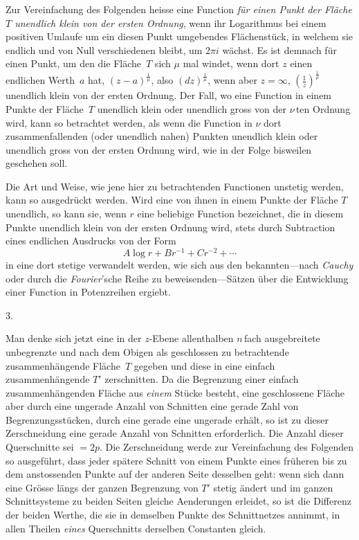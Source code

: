 \documentclass[a4paper,12pt,leqno]{article}
\begin{document}
Zur Vereinfachung des Folgenden heisse eine Function
\emph{f\"{u}r einen Punkt der Fl\"{a}che $T$ unendlich klein von
der ersten Ordnung}, wenn ihr Logarithmus bei einem positiven
Umlaufe um ein diesen Punkt umgebendes Fl\"{a}chenst\"{u}ck, in
welchem sie endlich und von Null verschiedenen bleibt, um
$2\pi i$ w\"{a}chst.  Es ist demnach f\"{u}r einen Punkt, um den
die Fl\"{a}che~$T$ sich $\mu$ mal windet, wenn dort $z$ einen
endlichen Werth~$a$ hat,
$\displaystyle (z - a)^{\frac{1}{\mu}}$,
also
$\displaystyle (dz)^{\frac{1}{\mu}}$,
wenn aber $z = \infty$,
$\displaystyle \left( \frac{1}{z} \right)^{\frac{1}{\mu}}$
unendlich klein von der ersten Ordnung.  Der Fall, wo eine
Function in einem Punkte der Fl\"{a}che~$T$ unendlich klein oder
unendlich gross von der $\nu \,$\-ten Ordnung wird, kann so
betrachtet werden, als wenn die Function in $\nu$ dort
zusammenfallenden (oder unendlich nahen) Punkten unendlich klein
oder unendlich gross von der ersten Ordnung wird, wie in der
Folge bisweilen geschehen soll.

Die Art und Weise, wie jene hier zu betrachtenden Functionen
unstetig werden, kann so ausgedr\"{u}ckt werden.  Wird eine von
ihnen in einem Punkte der Fl\"{a}che $T$ unendlich, so kann sie,
wenn $r$ eine beliebige Function bezeichnet, die in diesem Punkte
unendlich klein von der ersten Ordnung wird, stets durch
Subtraction eines endlichen Ausdrucks von der Form
\[ A \log r + B r^{-1} + C r^{-2} + \cdots \]
in eine dort stetige verwandelt werden, wie sich aus den
bekannten---nach \emph{Cauchy} oder durch die
\emph{Fourier}'sche Reihe zu beweisenden---S\"{a}tzen \"{u}ber
die Entwicklung einer Function in Potenzreihen ergiebt.

\medbreak

\centerline{3.}

\nobreak\medskip

Man denke sich jetzt eine in der $z$-Ebene allenthalben $n \,$\-fach
ausgebreitete unbegrenzte und nach dem Obigen als geschlossen zu
betrachtende zusammenh\"{a}ngende Fl\"{a}che~$T$ gegeben und
diese in eine einfach zusammenh\"{a}ngende $T'$ zerschnitten.  Da
die Begrenzung einer einfach zusammenh\"{a}ngenden Fl\"{a}che aus
\emph{einem} St\"{u}cke besteht, eine geschlossene Fl\"{a}che
aber durch eine ungerade Anzahl von Schnitten eine gerade Zahl
von Begrenzungsst\"{u}cken, durch eine gerade eine ungerade
erh\"{a}lt, so ist zu dieser Zerschneidung eine gerade Anzahl von
Schnitten erforderlich.  Die Anzahl dieser Querschnitte sei
$= 2p$.  Die Zerschneidung werde zur Vereinfachung des Folgenden
so ausgef\"{u}hrt, dass jeder sp\"{a}tere Schnitt von einem
Punkte eines fr\"{u}heren bis zu dem anstossenden Punkte auf der
anderen Seite desselben geht: wenn sich dann eine Gr\"{o}sse
l\"{a}ngs der ganzen Begrenzung von $T'$ stetig \"{a}ndert und im
ganzen Schnittsysteme zu beiden Seiten gleiche Aenderungen
erleidet, so ist die Differenz der beiden Werthe, die sie in
demselben Punkte des Schnittnetzes annimmt, in allen Theilen
\emph{eines} Querschnitts derselben Constanten gleich.
\end{document}
